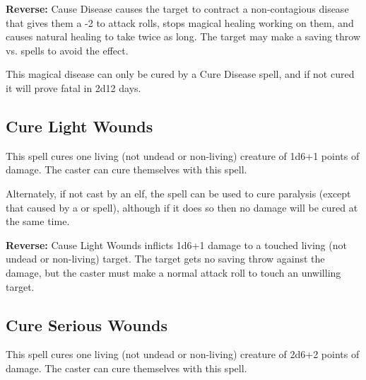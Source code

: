 \begin{multicols*}{2}
\textbf{Reverse:} \hypertarget{spell:Cause Disease}{Cause Disease} causes the target to contract a non-contagious disease that gives them a -2 to attack rolls, stops magical healing working on them, and causes natural healing to take twice as long. The target may make a saving throw vs. spells to avoid the effect.

This magical disease can only be cured by a Cure Disease spell, and if not cured it will prove fatal in 2d12 days.

\subsection{Cure Light Wounds}\label{spell:Cure Light Wounds}

This spell cures one living (not undead or non-living) creature of 1d6+1 points of damage. The caster can cure themselves with this spell.

Alternately, if not cast by an elf, the spell can be used to cure paralysis (except that caused by a  or  spell), although if it does so then no damage will be cured at the same time.

\textbf{Reverse:} \hypertarget{spell:Cause Light Wounds}{Cause Light Wounds} inflicts 1d6+1 damage to a touched living (not undead or non-living) target. The target gets no saving throw against the damage, but the caster must make a normal attack roll to touch an unwilling target.

\subsection{Cure Serious Wounds}\label{spell:Cure Serious Wounds}

This spell cures one living (not undead or non-living) creature of 2d6+2 points of damage. The caster can cure themselves with this spell.


\end{multicols*}
